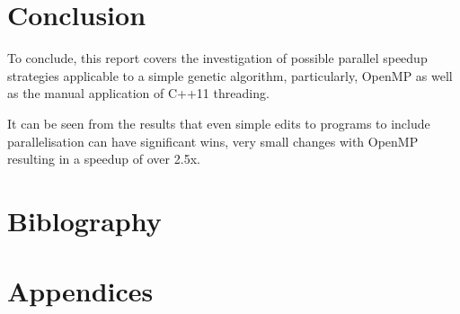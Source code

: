 \documentclass[a4paper]{article}
\begin{document}
    \section{Conclusion}
    To conclude, this report covers the investigation of possible parallel speedup strategies applicable to a simple
    genetic algorithm, particularly, OpenMP as well as the manual application of C++11 threading.

    It can be seen from the results that even simple edits to programs to include parallelisation can have significant
    wins, very small changes with OpenMP resulting in a speedup of over 2.5x.

    \section{Biblography}
    
    

    \section{Appendices}
\end{document}
